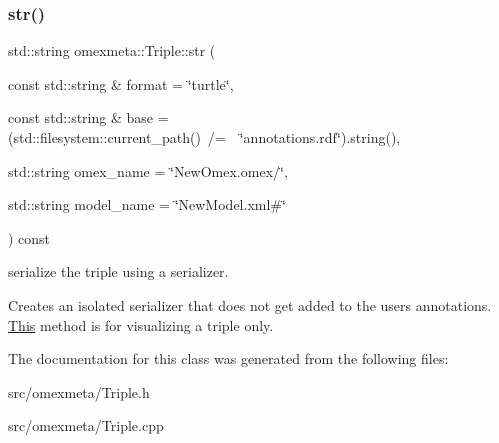 \subsubsection{\texorpdfstring{str()}{str()}}
{\footnotesize\ttfamily std\+::string omexmeta\+::\+Triple\+::str (\begin{DoxyParamCaption}\item[{const std\+::string \&}]{format = {\ttfamily \char`\"{}turtle\char`\"{}},  }\item[{const std\+::string \&}]{base = {\ttfamily (std\+:\+:filesystem\+:\+:current\+\_\+path()~/=~~\char`\"{}annotations.rdf\char`\"{}).string()},  }\item[{std\+::string}]{omex\+\_\+name = {\ttfamily \char`\"{}NewOmex.omex/\char`\"{}},  }\item[{std\+::string}]{model\+\_\+name = {\ttfamily \char`\"{}NewModel.xml\#\char`\"{}} }\end{DoxyParamCaption}) const}



serialize the triple using a  serializer. 

Creates an isolated serializer that does not get added to the users annotations. \hyperlink{classThis}{This} method is for visualizing a triple only. 

The documentation for this class was generated from the following files\+:\begin{DoxyCompactItemize}
\item 
src/omexmeta/Triple.\+h\item 
src/omexmeta/Triple.\+cpp\end{DoxyCompactItemize}
